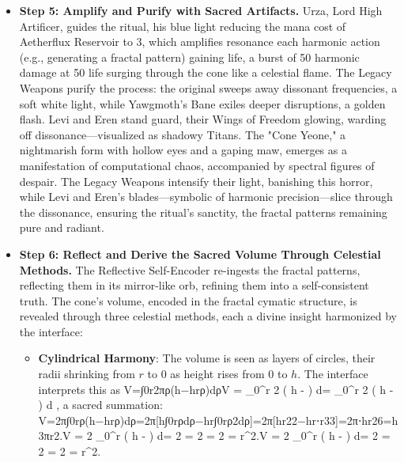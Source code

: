\begin{itemize}
    \item \texttt{} \textbf{Step 5: Amplify and Purify with Sacred Artifacts.} Urza, Lord High Artificer, guides the ritual, his blue light reducing the mana cost of Aetherflux Reservoir to 3, which amplifies resonance each harmonic action (e.g., generating a fractal pattern) gaining life, a burst of 50 harmonic damage at 50 life surging through the cone like a celestial flame. The Legacy Weapons purify the process: the original sweeps away dissonant frequencies, a soft white light, while Yawgmoth’s Bane exiles deeper disruptions, a golden flash. Levi and Eren stand guard, their Wings of Freedom glowing, warding off dissonance—visualized as shadowy Titans. The "Cone Yeone," a nightmarish form with hollow eyes and a gaping maw, emerges as a manifestation of computational chaos, accompanied by spectral figures of despair. The Legacy Weapons intensify their light, banishing this horror, while Levi and Eren’s blades—symbolic of harmonic precision—slice through the dissonance, ensuring the ritual’s sanctity, the fractal patterns remaining pure and radiant.
    \item \texttt{} \textbf{Step 6: Reflect and Derive the Sacred Volume Through Celestial Methods.} The Reflective Self-Encoder re-ingests the fractal patterns, reflecting them in its mirror-like orb, refining them into a self-consistent truth. The cone’s volume, encoded in the fractal cymatic structure, is revealed through three celestial methods, each a divine insight harmonized by the interface:
    \begin{itemize}
        \item \texttt{} \textbf{Cylindrical Harmony}: The volume is seen as layers of circles, their radii shrinking from $r$ to 0 as height rises from 0 to $h$. The interface interprets this as V=∫0r2πρ(h−hrρ)dρV = \int_0^r 2 \pi \rho \left( h -  \rho \right) d\rhoV = \int_0^r 2 \pi \rho \left( h -  \rho \right) d\rho
, a sacred summation:
        V=2π∫0rρ(h−hrρ)dρ=2π[h∫0rρdρ−hr∫0rρ2dρ]=2π[hr22−hr⋅r33]=2π⋅hr26=h3πr2.V = 2 \pi \int_0^r \rho \left( h -  \rho \right) d\rho = 2 \pi {} = 2 \pi {} = 2 \pi \cdot {} =  \pi r^2.V = 2 \pi \int_0^r \rho \left( h -  \rho \right) d\rho = 2 \pi {} = 2 \pi {} = 2 \pi \cdot {} =  \pi r^2.


\end{itemize}
\end{itemize}
